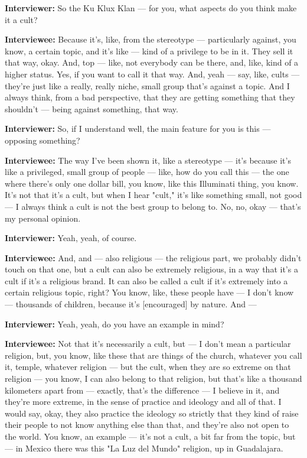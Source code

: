 \textbf{Interviewer:} So the Ku Klux Klan — for you, what aspects do you think make it a cult?

\textbf{Interviewee:} Because it's, like, from the stereotype — particularly against, you know, a certain topic, and it's like — kind of a privilege to be in it. They sell it that way, okay. And, top — like, not everybody can be there, and, like, kind of a higher status. Yes, if you want to call it that way. And, yeah — say, like, cults — they're just like a really, really niche, small group that's against a topic. And I always think, from a bad perspective, that they are getting something that they shouldn't — being against something, that way.

\textbf{Interviewer:} So, if I understand well, the main feature for you is this — opposing something?

\textbf{Interviewee:} The way I've been shown it, like a stereotype — it's because it's like a privileged, small group of people — like, how do you call this — the one where there's only one dollar bill, you know, like this Illuminati thing, you know. It's not that it's a cult, but when I hear "cult," it's like something small, not good — I always think a cult is not the best group to belong to. No, no, okay — that's my personal opinion.

\textbf{Interviewer:} Yeah, yeah, of course.

\textbf{Interviewee:} And, and — also religious — the religious part, we probably didn't touch on that one, but a cult can also be extremely religious, in a way that it's a cult if it's a religious brand. It can also be called a cult if it's extremely into a certain religious topic, right? You know, like, these people have — I don't know — thousands of children, because it's [encouraged] by nature. And —

\textbf{Interviewer:} Yeah, yeah, do you have an example in mind?

\textbf{Interviewee:} Not that it's necessarily a cult, but — I don't mean a particular religion, but, you know, like these that are things of the church, whatever you call it, temple, whatever religion — but the cult, when they are so extreme on that religion — you know, I can also belong to that religion, but that's like a thousand kilometers apart from — exactly, that's the difference — I believe in it, and they're more extreme, in the sense of practice and ideology and all of that. I would say, okay, they also practice the ideology so strictly that they kind of raise their people to not know anything else than that, and they're also not open to the world. You know, an example — it's not a cult, a bit far from the topic, but — in Mexico there was this "La Luz del Mundo" religion, up in Guadalajara.


